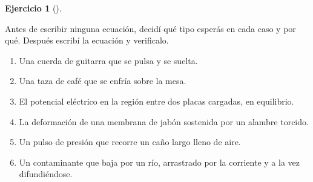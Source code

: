 \documentclass[
  spanish,
  a4paper,
]{scrbook}
\providecommand{\tightlist}{%
  \setlength{\itemsep}{0pt}\setlength{\parskip}{0pt}}
\theoremstyle{definition}
\theoremstyle{plain}
\theoremstyle{definition}
\theoremstyle{plain}
\theoremstyle{definition}
\newtheorem{exercise}{Ejercicio}[chapter]
\theoremstyle{remark}
\begin{document}
\begin{exercise}[]\protect\hypertarget{exr-adivinar-tipo}{}\label{exr-adivinar-tipo}

Antes de escribir ninguna ecuación, decidí qué tipo esperás en cada caso
y por qué. Después escribí la ecuación y verificalo.

\begin{enumerate}
\def\labelenumi{\alph{enumi}.}
\tightlist
\item
  Una cuerda de guitarra que se pulsa y se suelta.
\item
  Una taza de café que se enfría sobre la mesa.
\item
  El potencial eléctrico en la región entre dos placas cargadas, en
  equilibrio.
\item
  La deformación de una membrana de jabón sostenida por un alambre
  torcido.
\item
  Un pulso de presión que recorre un caño largo lleno de aire.
\item
  Un contaminante que baja por un río, arrastrado por la corriente y a
  la vez difundiéndose.
\end{enumerate}

\end{exercise}
\end{document}
